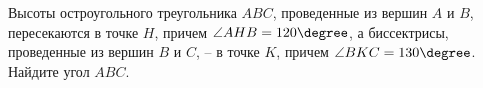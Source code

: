 \begin{ex}
	\begin{condition}
		Высоты остроугольного треугольника \( ABC \), проведенные из вершин \( A  \) и \( B \), пересекаются в точке \( H \), причем \( \angle AHB = 120\degree \), а биссектрисы, проведенные из вершин \( B \) и \( C \), – в точке \( K \), причем \( \angle BKC = 130\degree \). Найдите угол \( ABC \).
	\end{condition}
	\answer{\( 40\degree \)}
\end{ex}